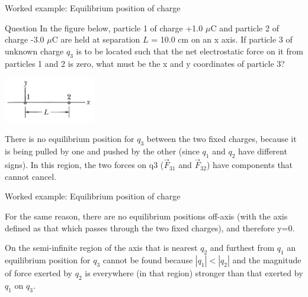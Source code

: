 {
\problemslide

\begin{frame}{Worked example: Equilibrium position of charge}

\begin{blockexmplque}{Question}
  In the figure below, particle 1 of charge +1.0 $\mu$C and particle 2
  of charge -3.0 $\mu$C are held at separation $L$ = 10.0 cm on an x axis.
  If particle 3 of unknown charge $q_3$ is to be located such that the net
  electrostatic force on it from particles 1 and 2 is zero,
  what must be the x and y coordinates of particle 3?
  \begin{center}
      \includegraphics[width=0.30\textwidth]{./images/problems/lect01_3charges_0_net_force_on_third.png}
  \end{center}
\end{blockexmplque}

\vspace{0.2cm}

There is no equilibrium position for $q_3$ between the two fixed charges,
because it is being pulled by one and pushed by the other
(since $q_1$ and $q_2$ have different signs).
In this region, the two forces on q3 ($\vec{F}_{31}$ and $\vec{F}_{32}$)
have components that cannot cancel.

\end{frame}

%
%
%

\begin{frame}{Worked example: Equilibrium position of charge}

  For the same reason, there are no equilibrium positions off-axis
  (with the axis defined as that which passes through the two fixed charges),
  and therefore y=0.\\
  \vspace{0.3cm}

  On the semi-infinite region of the axis that is nearest $q_2$
  and furthest from $q_1$ an equilibrium position for $q_3$ cannot be found
  because $|q_1| < |q_2|$ and the magnitude of force exerted by $q_2$
  is everywhere (in that region) stronger than that exerted by $q_1$ on $q_3$.\\
  \vspace{0.3cm}


\end{frame}}

